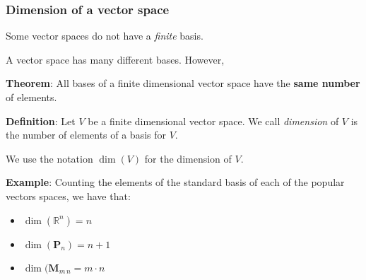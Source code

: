 \begin{frame}[fragile]
\frametitle{Dimension of  a vector space}

Some vector spaces do not have a {\em finite} basis. 

A vector space has many different bases. However,



\textbf{Theorem}: All bases of a finite dimensional vector space have the \textbf{same number} of elements.

\bigskip

\textbf{Definition}: Let $V$ be a finite dimensional vector space. We call {\em dimension} of $V$ is the number of elements of a basis for $V$. 

We use the notation $\dim (V)$ for the dimension of $V$.

\bigskip

\textbf{Example}: Counting the elements of the standard basis of each of the popular vectors spaces, we have that:

\begin{itemize}

\item $\dim (\mathbb{R}^n) = n$

\item $\dim (\textbf{P}_n) = n+1$
 
\item $\dim (\textbf{M}_{m \, n} = m \cdot n$

\end{itemize}

\end{frame}


